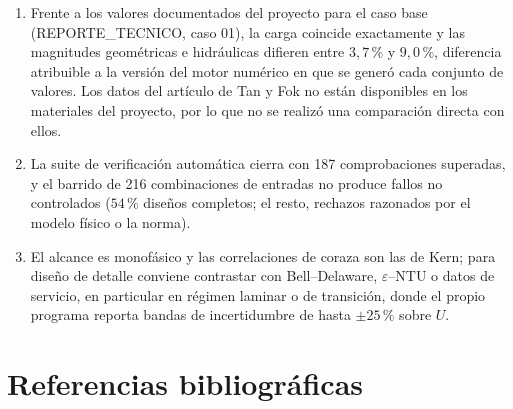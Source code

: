 \documentclass[11pt,a4paper]{article}
\begin{document}
\begin{enumerate}[leftmargin=1.6em]
\item Frente a los valores documentados del proyecto para el caso base
(REPORTE\_TECNICO, caso 01), la carga coincide exactamente y las magnitudes
geom\'etricas e hidr\'aulicas difieren entre $3{,}7\,\%$ y $9{,}0\,\%$,
diferencia atribuible a la versi\'on del motor num\'erico en que se gener\'o
cada conjunto de valores. Los datos del art\'iculo de Tan y Fok \cite{tanfok}
no est\'an disponibles en los materiales del proyecto, por lo que no se
realiz\'o una comparaci\'on directa con ellos.

\item La suite de verificaci\'on autom\'atica cierra con 187 comprobaciones
superadas, y el barrido de 216 combinaciones de entradas no produce fallos no
controlados ($54\,\%$ dise\~nos completos; el resto, rechazos razonados por el
modelo f\'isico o la norma).

\item El alcance es monof\'asico y las correlaciones de coraza son las de Kern;
para dise\~no de detalle conviene contrastar con Bell--Delaware,
$\varepsilon$--NTU o datos de servicio, en particular en r\'egimen laminar o de
transici\'on, donde el propio programa reporta bandas de incertidumbre de hasta
$\pm 25\,\%$ sobre $U$.
\end{enumerate}


\section{Referencias bibliográficas}
\label{sec:Referencias bibliográficas}
\end{document}
